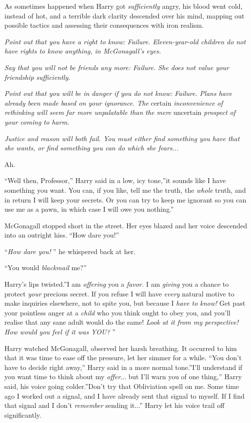 As sometimes happened when Harry got \emph{sufficiently} angry, his
blood went cold, instead of hot, and a terrible dark clarity descended
over his mind, mapping out possible tactics and assessing their
consequences with iron realism.

\emph{Point out that you have a right to know: Failure. Eleven-year-old
children do not have rights to know anything, in McGonagall's eyes.}

\emph{Say that you will not be friends any more: Failure. She does not
value your friendship sufficiently.}

\emph{Point out that you will be in danger if you do not know: Failure.
Plans have already been made based on your ignorance. The} certain
\emph{inconvenience of rethinking will seem far more unpalatable than
the mere} uncertain \emph{prospect of your coming to harm.}

\emph{Justice and reason will both fail. You must either find something
you have that she wants, or find something you can do which she
fears...}

Ah.

``Well then, Professor,'' Harry said in a low, icy tone,''it sounds like
I have something you want. You can, if you like, tell me the truth, the
\emph{whole} truth, and in return I will keep your secrets. Or you can
try to keep me ignorant so you can use me as a pawn, in which case I
will owe you nothing.''

McGonagall stopped short in the street. Her eyes blazed and her voice
descended into an outright hiss. ``How dare you!''

``\emph{How dare you!} '' he whispered back at her.

``You would \emph{blackmail} me?''

Harry's lips twisted.''I am \emph{offering} you a \emph{favor.} I am
\emph{giving} you a chance to protect \emph{your} precious secret. If
you refuse I will have \emph{every} natural motive to make inquiries
elsewhere, not to spite you, but because I \emph{have to know!} Get past
your pointless anger at a \emph{child} who you think ought to obey you,
and you'll realise that any sane adult would do the same! \emph{Look at
it from my perspective! How would you feel if it was YOU?} ''

Harry watched McGonagall, observed her harsh breathing. It occurred to
him that it was time to ease off the pressure, let her simmer for a
while. ``You don't have to decide right away,'' Harry said in a more
normal tone.''I'll understand if you want time to think about my
\emph{offer}... but I'll warn you of one thing,'' Harry said, his
voice going colder.''Don't try that Obliviation spell on me. Some time
ago I worked out a signal, and I have already sent that signal to
myself. If I find that signal and I don't \emph{remember} sending
it...'' Harry let his voice trail off significantly.

